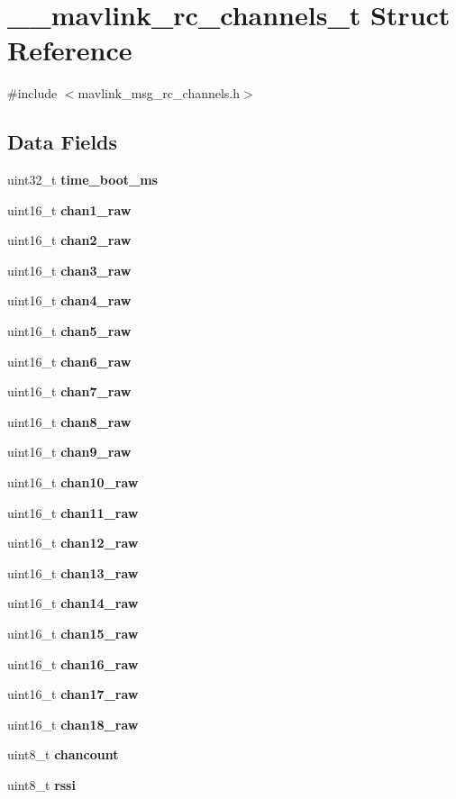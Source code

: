 \section{\+\_\+\+\_\+mavlink\+\_\+rc\+\_\+channels\+\_\+t Struct Reference}
\label{struct____mavlink__rc__channels__t}


{\ttfamily \#include $<$mavlink\+\_\+msg\+\_\+rc\+\_\+channels.\+h$>$}

\subsection*{Data Fields}
\begin{DoxyCompactItemize}
\item 
uint32\+\_\+t \textbf{ time\+\_\+boot\+\_\+ms}
\item 
uint16\+\_\+t \textbf{ chan1\+\_\+raw}
\item 
uint16\+\_\+t \textbf{ chan2\+\_\+raw}
\item 
uint16\+\_\+t \textbf{ chan3\+\_\+raw}
\item 
uint16\+\_\+t \textbf{ chan4\+\_\+raw}
\item 
uint16\+\_\+t \textbf{ chan5\+\_\+raw}
\item 
uint16\+\_\+t \textbf{ chan6\+\_\+raw}
\item 
uint16\+\_\+t \textbf{ chan7\+\_\+raw}
\item 
uint16\+\_\+t \textbf{ chan8\+\_\+raw}
\item 
uint16\+\_\+t \textbf{ chan9\+\_\+raw}
\item 
uint16\+\_\+t \textbf{ chan10\+\_\+raw}
\item 
uint16\+\_\+t \textbf{ chan11\+\_\+raw}
\item 
uint16\+\_\+t \textbf{ chan12\+\_\+raw}
\item 
uint16\+\_\+t \textbf{ chan13\+\_\+raw}
\item 
uint16\+\_\+t \textbf{ chan14\+\_\+raw}
\item 
uint16\+\_\+t \textbf{ chan15\+\_\+raw}
\item 
uint16\+\_\+t \textbf{ chan16\+\_\+raw}
\item 
uint16\+\_\+t \textbf{ chan17\+\_\+raw}
\item 
uint16\+\_\+t \textbf{ chan18\+\_\+raw}
\item 
uint8\+\_\+t \textbf{ chancount}
\item 
uint8\+\_\+t \textbf{ rssi}
\end{DoxyCompactItemize}


